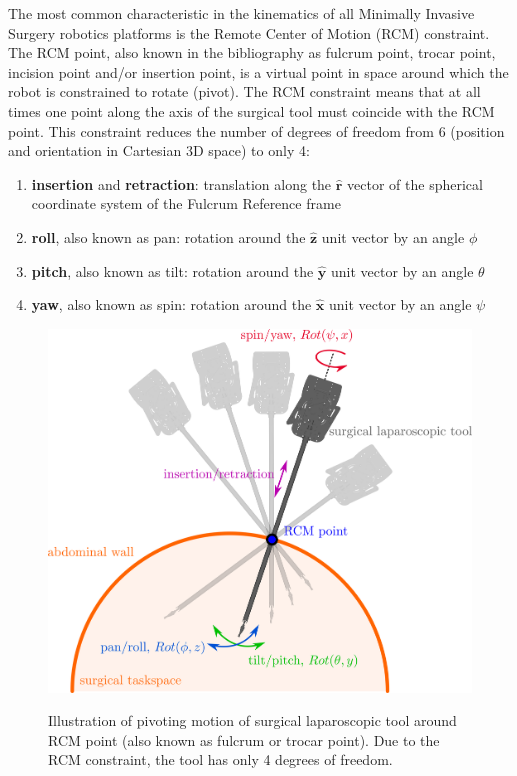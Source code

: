 The most common characteristic in the kinematics of all Minimally Invasive Surgery robotics platforms is the Remote Center of Motion (RCM) constraint. The RCM point, also known in the bibliography as fulcrum point, 
trocar point, incision point and/or insertion point, is a virtual point in space around which the robot is constrained to rotate (pivot). The RCM constraint means that at all times one point along the axis of the surgical 
tool must coincide with the RCM point. This constraint reduces the number of degrees of freedom from 6 (position and orientation in Cartesian 3D space) to only 4:
\begin{enumerate}
\item \textbf{insertion} and \textbf{retraction}: translation along the $\mathbf{\hat{r}}$ vector of the spherical coordinate system of the Fulcrum Reference frame
\item \textbf{roll}, also known as pan: rotation around the $\mathbf{\hat{z}}$ unit vector by an angle $\phi$
\item \textbf{pitch}, also known as tilt: rotation around the $\mathbf{\hat{y}}$ unit vector by an angle $\theta$
\item \textbf{yaw}, also known as spin: rotation around the $\mathbf{\hat{x}}$ unit vector by an angle $\psi$
\end{enumerate}

\begin{center}
\begin{figure}[H]
\centering
\includegraphics[width=\textwidth]{images/rcm-surgical-tool.png}\\
\caption{Illustration of pivoting motion of surgical laparoscopic tool around RCM point (also known as fulcrum or trocar point). Due to the RCM constraint, the tool has only 4 degrees of freedom.}
\end{figure}
\end{center}

